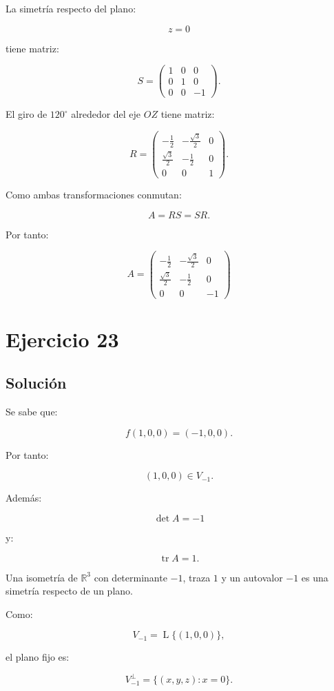 \documentclass[11pt,a4paper]{article}
\newcommand{\R}{\mathbb{R}}
\newcommand{\tr}{\operatorname{tr}}
\newcommand{\Span}{\operatorname{L}}
\begin{document}
La simetría respecto del plano:

\[
z=0
\]

tiene matriz:

\[
S=
\begin{pmatrix}
1&0&0\\
0&1&0\\
0&0&-1
\end{pmatrix}.
\]

El giro de \(120^\circ\) alrededor del eje \(OZ\) tiene matriz:

\[
R=
\begin{pmatrix}
-\frac12&-\frac{\sqrt3}{2}&0\\[1mm]
\frac{\sqrt3}{2}&-\frac12&0\\
0&0&1
\end{pmatrix}.
\]

Como ambas transformaciones conmutan:

\[
A=RS=SR.
\]

Por tanto:

\[
\boxed{
A=
\begin{pmatrix}
-\frac12&-\frac{\sqrt3}{2}&0\\[1mm]
\frac{\sqrt3}{2}&-\frac12&0\\
0&0&-1
\end{pmatrix}
}
\]

\section{Ejercicio 23}
\subsection{Solución}

Se sabe que:

\[
f(1,0,0)=(-1,0,0).
\]

Por tanto:

\[
(1,0,0)\in V_{-1}.
\]

Además:

\[
\det A=-1
\]

y:

\[
\tr A=1.
\]

Una isometría de \(\R^3\) con determinante \(-1\), traza \(1\) y un autovalor \(-1\) es una simetría respecto de un plano.

Como:

\[
V_{-1}
=
\Span\{(1,0,0)\},
\]

el plano fijo es:

\[
V_{-1}^\perp
=
\{(x,y,z):x=0\}.
\]
\end{document}

